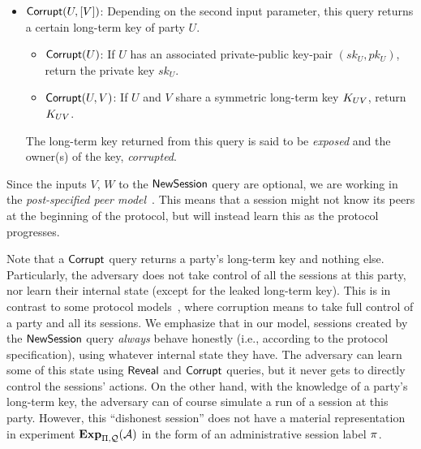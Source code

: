 \begin{itemize}
	
	\item $\mathsf{Corrupt}(U, [V])$:
	Depending on the second input parameter,
	this query returns a certain long-term key of party $U$.
	
	\begin{itemize}
		\item $\mathsf{Corrupt}(U)$: 
		If $U$ has an associated private-public key-pair $(sk_U,pk_U)$,
		return the private key $sk_U$.
		
		\item $\mathsf{Corrupt}(U, V)$:
		If $U$ and $V$ share a symmetric long-term key $K_{UV}$,
		 return $K_{UV}$. 
	\end{itemize}
	The long-term key returned from this query is said to be \emph{exposed}
	and the owner(s) of the key, \emph{corrupted}. 
\end{itemize}

Since the inputs $V$, $W$ to the $\mathsf{NewSession}$ query are optional,
we are working in the \emph{post-specified peer model}~\cite{C:CanKra02}.
This means that a session  might not know its peers at the beginning of the protocol,
but will instead learn this as the protocol progresses.

Note that a $\mathsf{Corrupt}$ query returns a party's long-term key and nothing else.
Particularly,
the adversary does not take control of all the sessions at this party,
nor learn their internal state
(except for the leaked long-term key).
This is in contrast to some protocol models~\cite{EC:CanKra01,C:CanKra02},
where corruption means to take full control of a party and all its sessions. 
We emphasize that in our model,
sessions created by the $\mathsf{NewSession}$ query \emph{always} behave honestly
(i.e., according to the protocol specification), using whatever internal state they have.
The adversary can learn some of this state using $\mathsf{Reveal}$ and $\mathsf{Corrupt}$ queries,
but it never gets to directly control the sessions' actions.
On the other hand,
with the knowledge of a party's long-term key,
the adversary can of course simulate a run of a session at this party.
However,
this ``dishonest session'' does not have a material representation in experiment $\mathbf{Exp}_{\mathrm{\Pi},\mathcal{Q}}^{}(\mathcal{A})$ in the form of an administrative session label $\oracle$.







